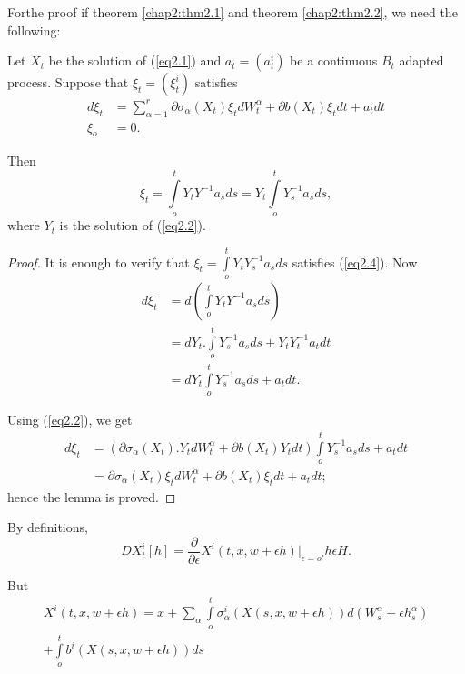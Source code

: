 For\pageoriginale the proof if theorem \ref{chap2:thm2.1} and theorem
\ref{chap2:thm2.2}, we need the following: 

\setcounter{lem}{0}
\begin{lem}%
  Let $X_t$ be the solution of (\ref{eq2.1}) and $a_t = (a^i_t)$ be a
  continuous $B_t$ adapted process. Suppose that $\xi _t = (\xi^i_t)$
  satisfies 
  \begin{align*}
    d \xi_t & = \sum_{\alpha=1}^r \partial \sigma_\alpha (X_t)\xi_t
    dW^\alpha_t + \partial b (X_t) \xi_t dt + a_t dt\\ 
    \xi_o & = 0. \tag{2.4}\label{eq2.4}
  \end{align*}
\end{lem}

Then
$$
\xi_t = \int\limits_o^t Y_t Y^{-1}a_s ds = Y_t \int\limits_o^t
Y^{-1}_s a_s ds,
$$
where $Y_t$ is the solution of (\ref{eq2.2}).

\begin{proof}
It is enough to verify that $\xi_t = \int\limits_o^t  Y_t Y_s^{-1} a_s
ds$ satisfies (\ref{eq2.4}). Now 
\begin{align*}
  d \xi_t & = d (\int\limits_o^t  Y_t Y^{-1} a_s ds)\\
  & = dY_t.\int\limits_o^t  Y^{-1}_s a_s ds + Y_t Y_t^{-1} a_t dt\\
  & = dY_t \int\limits_o^t   Y^{-1}_s a_s ds + a_t dt.\tag*{$\Box$}
\end{align*}

Using (\ref{eq2.2}), we get
\begin{align*}
  d \xi_t & = (\partial \sigma_\alpha(X_t). Y_t dW^\alpha_t + \partial b
  (X_t) Y_t dt) \int\limits_o^t Y_s^{-1} a_s ds + a_t dt\\ 
  & = \partial \sigma_\alpha(X_t) \xi_t dW^\alpha_t + \partial b
  (X_t)\xi_t dt + a_t dt ; 
\end{align*}
hence the lemma is proved.
\end{proof}


\medskip
{}\pageoriginale

By definitions,
$$
DX_t^i[h] = \frac{\partial}{\partial \epsilon} X^i (t,x,w +
\epsilon  h)|_{\epsilon  = o'} h \epsilon  H. 
$$

But
\begin{multline*}
X^i (t,x,w + \epsilon  h) = x + \sum_\alpha \int\limits_o^t
\sigma^i_\alpha (X(s,x,w + \epsilon  h)) d (W^\alpha_s + \epsilon 
h ^\alpha_s)\\ 
+ \int\limits_o^t b^i (X(s,x,w + \epsilon  h)) ds 
\end{multline*}

